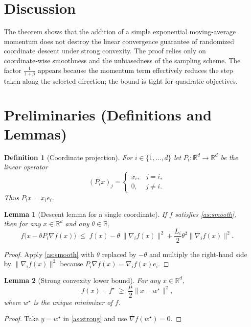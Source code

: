 \documentclass{article}
\newtheorem{lemma}{Lemma}
\newtheorem{definition}{Definition}
\newcommand{\R}{\mathbb{R}}
\begin{document}
\section*{Discussion}
The theorem shows that the addition of a simple exponential moving‑average momentum
does not destroy the linear convergence guarantee of randomized coordinate
descent under strong convexity. The proof relies only on coordinate‑wise smoothness
and the unbiasedness of the sampling scheme. The factor $\frac{1}{1+\beta}$ appears
because the momentum term effectively reduces the step taken along the selected
direction; the bound is tight for quadratic objectives.

\newpage
\section*{Preliminaries (Definitions and Lemmas)}
\begin{definition}[Coordinate projection]
For $i\in\{1,\dots ,d\}$ let $P_i:\R^{d}\to\R^{d}$ be the linear operator
\[
    (P_i x)_j = 
    \begin{cases}
        x_i, & j=i,\\
        0,   & j\neq i .
    \end{cases}
\]
Thus $P_i x = x_i e_i$.
\end{definition}

\begin{lemma}[Descent lemma for a single coordinate]
\label{lem:descent}
If $f$ satisfies \eqref{as:smooth}, then for any $x\in\R^{d}$ and any $\theta\in\R$,
\[
    f\bigl(x-\theta P_i \nabla f(x)\bigr)\;\le\;
    f(x)-\theta\,\|\nabla_i f(x)\|^{2}
    +\frac{L_i}{2}\theta^{2}\|\nabla_i f(x)\|^{2}.
\tag{6}
\]
\end{lemma}
\begin{proof}
Apply \eqref{as:smooth} with $\theta$ replaced by $-\theta$ and multiply the
right‑hand side by $\|\nabla_i f(x)\|^{2}$ because $P_i \nabla f(x)=\nabla_i f(x)e_i$.
\end{proof}

\begin{lemma}[Strong convexity lower bound]
\label{lem:strong}
For any $x\in\R^{d}$,
\[
    f(x)-f^{\star}\;\ge\;\frac{\mu}{2}\|x-w^{\star}\|^{2},
\tag{7}
\]
where $w^{\star}$ is the unique minimizer of $f$.
\end{lemma}
\begin{proof}
Take $y=w^{\star}$ in \ref{as:strong} and use $\nabla f(w^{\star})=0$.
\end{proof}
\end{document}
